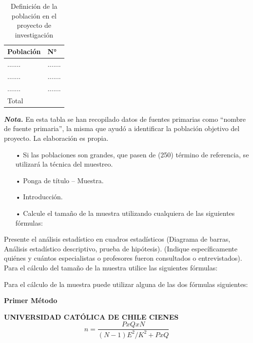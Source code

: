 \documentclass[12pt, a4paper, nofontenc, numbers=endperiod]{apa7}
\begin{document}
{\begin{table}[h]
	\caption{Definición de la población en el proyecto de investigación}
	\label{Tabla3} %
	{\renewcommand{\arraystretch}{1.5} 
		\begin{tabular}{p{10cm}p{5.1cm}}
			\toprule
		\centering	Población&\hspace{0.15cm}N°\\
			\midrule
			\centering.......&....... \\
			\centering.......&....... \\
			\centering.......&....... \\
			 \midrule
			Total&\\
			\midrule
		\end{tabular}
		\begin{tablenotes}[para,flushleft]
			{\small
				\textit{\textbf{Nota.}} En esta tabla se han recopilado datos de fuentes primarias como “nombre de fuente primaria”, la misma que ayudó a identificar la población objetivo del proyecto. La elaboración es propia.
			}
		\end{tablenotes}
	}
\end{table}
	{\doublespacing
\begin{itemize}[leftmargin=1.70cm]
	\item[•]Si las poblaciones son grandes, que pasen de (250) término de referencia, se utilizará la técnica del muestreo.
	\item[•] Ponga de título – Muestra.
	\item[•] Introducción.
	\item[•] Calcule el tamaño de la muestra utilizando cualquiera de las siguientes fórmulas:
\end{itemize}
}
\setlength{\parindent}{1.27cm} Presente el análisis estadístico en cuadros estadísticos (Diagrama de barras, Análisis estadístico descriptivo, prueba de hipótesis). (Indique específicamente quiénes y cuántos 
especialistas o profesores fueron consultados o entrevistados). Para el cálculo del tamaño de la muestra utilice las siguientes fórmulas:

\setlength{\parindent}{1.27cm} 	Para el cálculo de la muestra puede utilizar alguna de las dos fórmulas siguientes: 

\setlength{\parindent}{1.27cm}\textbf{Primer Método}

\setlength{\parindent}{1.27cm}\textbf{UNIVERSIDAD CATÓLICA DE CHILE CIENES}
\vspace*{-0.5cm}
\begin{equation}
n = \frac{PxQxN}{(N-1) E^2 / K^2 + PxQ}
\end{equation}

}
\end{document}
